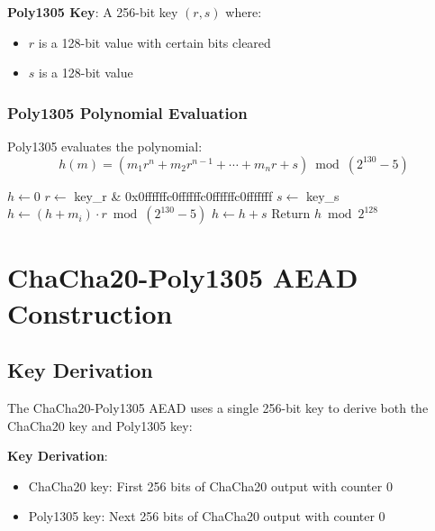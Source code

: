 \documentclass[11pt,a4paper]{article}
\begin{document}
\begin{mathbox}
\textbf{Poly1305 Key}: A 256-bit key $(r, s)$ where:
\begin{itemize}
    \item $r$ is a 128-bit value with certain bits cleared
    \item $s$ is a 128-bit value
\end{itemize}
\end{mathbox}

\subsubsection{Poly1305 Polynomial Evaluation}

Poly1305 evaluates the polynomial:
\[h(m) = (m_1 r^n + m_2 r^{n-1} + \cdots + m_n r + s) \bmod (2^{130} - 5)\]

\begin{algorithm}[H]
\caption{Poly1305 MAC Computation}
\begin{algorithmic}[1]
\State $h \leftarrow 0$
\State $r \leftarrow$ key\_r \& 0x0ffffffc0ffffffc0ffffffc0fffffff
\State $s \leftarrow$ key\_s
    \State $h \leftarrow (h + m_i) \cdot r \bmod (2^{130} - 5)$
\EndFor
\State $h \leftarrow h + s$
\State Return $h \bmod 2^{128}$
\end{algorithmic}
\end{algorithm}

\section{ChaCha20-Poly1305 AEAD Construction}

\subsection{Key Derivation}

The ChaCha20-Poly1305 AEAD uses a single 256-bit key to derive both the ChaCha20 key and Poly1305 key:

\begin{mathbox}
\textbf{Key Derivation}:
\begin{itemize}
    \item ChaCha20 key: First 256 bits of ChaCha20 output with counter 0
    \item Poly1305 key: Next 256 bits of ChaCha20 output with counter 0
\end{itemize}
\end{mathbox}
\end{document}
